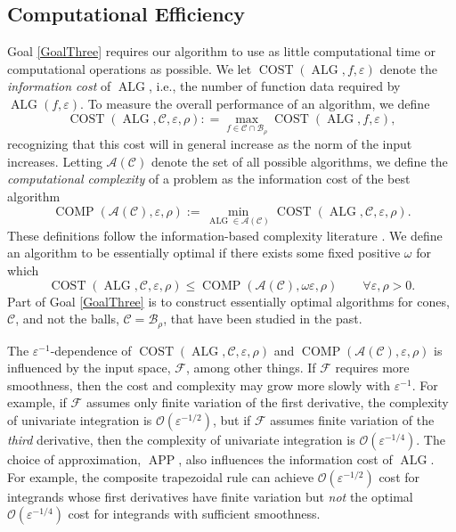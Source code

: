 \documentclass[11pt]{NSFamsart}
\DeclareMathOperator{\cost}{COST}
\DeclareMathOperator{\comp}{COMP}
\DeclareMathOperator{\APP}{APP}
\DeclareMathOperator{\ALG}{ALG}
\newcommand{\cc}{\mathcal{C}}
\newcommand{\cb}{\mathcal{B}}
\newcommand{\cala}{{\mathcal{A}}}
\newcommand{\calc}{{\mathcal{C}}}
\newcommand{\calf}{{\mathcal{F}}}
\newcommand{\Order}{\mathcal{O}}
\begin{document}
\subsection{Computational Efficiency} \label{sec:CompEff}

Goal \ref{GoalThree} requires our algorithm to use as little computational time or computational operations as possible.  We let $\cost(\ALG, f,\varepsilon)$ denote the \emph{information cost} of $\ALG$, i.e., the number of function data required by $\ALG(f,\varepsilon)$. To measure the overall performance of an algorithm, we define 
\begin{equation}
    \cost(\ALG, \calc, \varepsilon,\rho) : = \max_{f \in \calc \cap \cb_{\rho}} \cost(\ALG,f,\varepsilon),
\end{equation}
recognizing that this cost will in general increase as the norm of the input increases. Letting $\cala(\cc)$ denote the set of all possible algorithms, we define the \emph{computational complexity} of a problem as the information cost of the best algorithm
\begin{equation}
    \comp(\cala(\cc), \varepsilon,\rho) := \min_{\ALG \in \cala(\cc)} \cost(\ALG, \calc, \varepsilon,\rho) .
\end{equation}
These definitions follow the information-based complexity literature \cite{TraWasWoz88, TraWer98}.
We define an algorithm to be essentially optimal if there exists some fixed positive $\omega$ for which
\begin{equation}
    \cost(\ALG, \calc, \varepsilon,\rho) \le \comp(\cala(\cc), \omega \varepsilon,\rho) \qquad \forall \varepsilon,\rho > 0.
\end{equation}
Part of Goal \ref{GoalThree} is to construct essentially optimal algorithms for cones, $\calc$, and not the balls, $\calc = \cb_{\rho}$, that have been studied in the past.

The $\varepsilon^{-1}$-dependence of $\cost(\ALG, \calc, \varepsilon,\rho)$ and $\comp(\cala(\cc), \varepsilon,\rho)$ is influenced by the input space, $\calf$, among other things.  If $\calf$ requires more smoothness, then the cost and complexity may grow more slowly with $\varepsilon^{-1}$.  For example, if $\calf$  assumes only finite variation of the first derivative, the complexity of univariate integration is $\Order(\varepsilon^{-1/2})$, but if $\calf$ assumes finite variation of the \emph{third} derivative, then the complexity of univariate integration is $\Order(\varepsilon^{-1/4})$.  The choice of approximation, $\APP$, also influences the information cost of $\ALG$.  For example, the composite trapezoidal rule can achieve $\Order(\varepsilon^{-1/2})$ cost for integrands whose first derivatives have finite variation but \emph{not} the optimal $\Order(\varepsilon^{-1/4})$ cost for integrands with sufficient smoothness.
\end{document}
